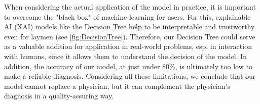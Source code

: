 When considering the actual application of the model in practice, it is important to overcome the "black box" of machine learning for users. For this, explainable AI (XAI) models like the Decision Tree help to be interpretable and trustworthy even for laymen (see \cref{fig:DecisionTree}). Therefore, our Decision Tree could serve as a valuable addition for application in real-world problems, esp. in interaction with humans, since it allows them to understand the decision of the model. In addition, the accuracy of our model, at just under 80\%, is ultimately too low to make a reliable diagnosis. Considering all these limitations, we conclude that our model cannot replace a physician, but it can complement the physician's diagnosis in a quality-assuring way. 




